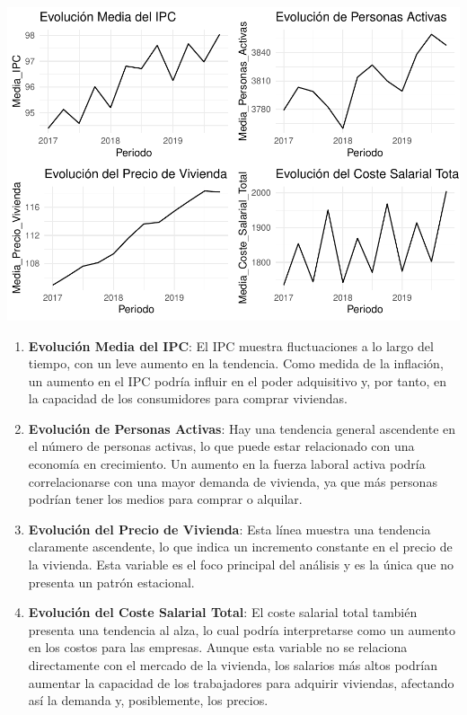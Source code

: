 \documentclass[
]{article}
\begin{document}
\includegraphics{trabajo_files/figure-latex/unnamed-chunk-4-1.pdf}

\begin{enumerate}
\def\labelenumi{\arabic{enumi}.}
\item
  \textbf{Evolución Media del IPC}: El IPC muestra fluctuaciones a lo
  largo del tiempo, con un leve aumento en la tendencia. Como medida de
  la inflación, un aumento en el IPC podría influir en el poder
  adquisitivo y, por tanto, en la capacidad de los consumidores para
  comprar viviendas.
\item
  \textbf{Evolución de Personas Activas}: Hay una tendencia general
  ascendente en el número de personas activas, lo que puede estar
  relacionado con una economía en crecimiento. Un aumento en la fuerza
  laboral activa podría correlacionarse con una mayor demanda de
  vivienda, ya que más personas podrían tener los medios para comprar o
  alquilar.
\item
  \textbf{Evolución del Precio de Vivienda}: Esta línea muestra una
  tendencia claramente ascendente, lo que indica un incremento constante
  en el precio de la vivienda. Esta variable es el foco principal del
  análisis y es la única que no presenta un patrón estacional.
\item
  \textbf{Evolución del Coste Salarial Total}: El coste salarial total
  también presenta una tendencia al alza, lo cual podría interpretarse
  como un aumento en los costos para las empresas. Aunque esta variable
  no se relaciona directamente con el mercado de la vivienda, los
  salarios más altos podrían aumentar la capacidad de los trabajadores
  para adquirir viviendas, afectando así la demanda y, posiblemente, los
  precios.
\end{enumerate}
\end{document}
